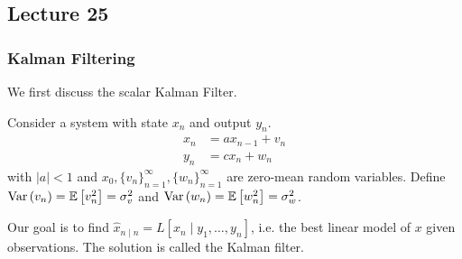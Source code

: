\subsection{Lecture 25}
\subsubsection{Kalman Filtering}

We first discuss the scalar Kalman Filter.

Consider a system with state $x_n$ and output $y_n$.
\begin{align*}
    x_n &= a x_{n - 1} + v_n \\
    y_n &= cx_n + w_n
\end{align*}
with $|a| < 1$ and $x_0, \{v_n\}_{n =1}^{\infty}, \{w_n\}_{n = 1}^{\infty}$ are zero-mean random variables.
Define $\text{Var}\left( v_n \right) = \mathbb{E}\left[ v_n^2 \right] = \sigma_v^2$ and $\text{Var}\left( w_n \right) = \mathbb{E}\left[ w_n^2 \right] = \sigma_w^2$.

Our goal is to find $\hat{x}_{n \mid n} = L[x_n \mid y_1, \dots, y_n]$, i.e.
the best linear model of $x$ given observations. The solution is called the Kalman filter.

